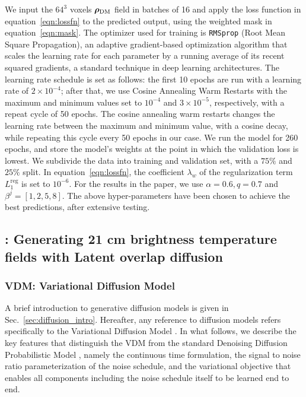 We input the $64^3$ voxels $\boldsymbol{\rho}_\mathrm{DM}$ field in batches of 16 and apply the loss function {in equation}~\eqref{eqn:lossfn} to the predicted output, using the weighted mask in {equation}~\eqref{eqn:mask}. The optimizer used for training is {\texttt{RMSprop} (Root Mean Square Propagation), an adaptive gradient-based optimization algorithm that scales the learning rate for each parameter by a running average of its recent squared gradients, a standard technique in deep learning architectures.} The learning rate schedule is set as follows: the first 10 epochs are run with a learning rate of $2\times10^{-4}$; after that, we use Cosine Annealing Warm Restarts with the maximum and minimum values set to $10^{-4}$ and $3\times10^{-5}$, respectively, with a repeat cycle of 50 epochs. {The cosine annealing warm restarts changes the learning rate between the maximum and minimum value, with a cosine decay, while repeating this cycle every 50 epochs in our case.} We run the model for 260 epochs, and store the model's weights at the point in which the validation loss is lowest. We subdivide the data into training and validation set, with a $75\%$ and $25\%$ split.
{In equation~\eqref{eqn:lossfn},} the coefficient $\lambda_w$ of the regularization term $L_1^{\text{reg}}$ is set to $10^{-6}$. For the results in the paper, we use $\alpha = 0.6,q=0.7$ and $\beta^j=[1,2,5,8]$. The above hyper-parameters have been chosen to achieve the best predictions, after extensive testing.



\subsection{\LODI: Generating 21 cm brightness temperature fields with Latent overlap diffusion}
\label{sec:paint_HI}



\subsubsection{VDM: Variational Diffusion Model}
\label{sec:vdm}

A brief introduction to generative diffusion models is given in Sec.~\ref{sec:diffusion_intro}. Hereafter, any reference to diffusion models refers specifically to the Variational Diffusion Model \citep[VDM;][]{kingma_variational_2023}. In what follows, we describe the key features that distinguish the VDM from the standard Denoising Diffusion Probabilistic Model \citep[DDPM;][]{ho_denoising_2020}, namely the continuous time formulation, the signal to noise ratio parameterization of the noise schedule, and the variational objective that enables all components including the noise schedule itself to be learned end to end.


